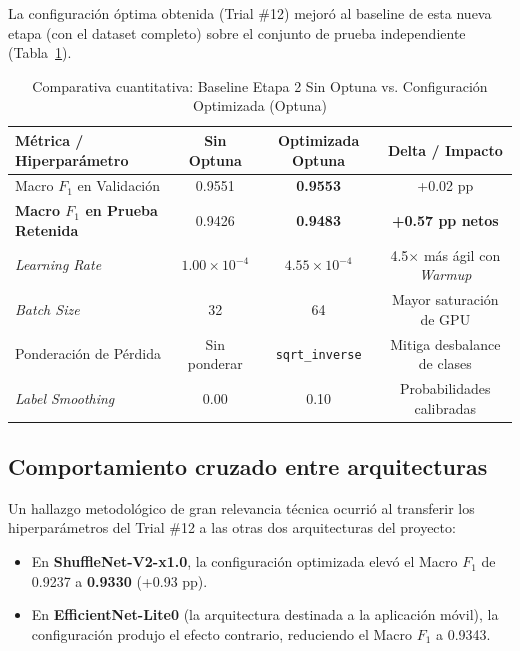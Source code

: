 \documentclass[12pt,letterpaper]{article}
\begin{document}
La configuraci\'on \'optima obtenida (Trial \#12) mejor\'o al baseline de esta nueva etapa (con el dataset completo) sobre el conjunto de prueba independiente (Tabla~\ref{tab:opt_vs_base}).

\begin{table}[H]
\caption{Comparativa cuantitativa: Baseline Etapa 2 Sin Optuna vs. Configuraci\'on Optimizada (Optuna)}
\label{tab:opt_vs_base}
\centering
\small
\begin{singlespace}
\begin{tabular}{lccc}
\toprule
\textbf{M\'etrica / Hiperpar\'ametro} & \textbf{Sin Optuna} & \textbf{Optimizada Optuna} & \textbf{Delta / Impacto} \\
\midrule
Macro $F_1$ en Validaci\'on & 0.9551 & \textbf{0.9553} & +0.02 pp \\
\textbf{Macro $F_1$ en Prueba Retenida} & 0.9426 & \textbf{0.9483} & \textbf{+0.57 pp netos} \\
\textit{Learning Rate} & $1.00 \times 10^{-4}$ & $4.55 \times 10^{-4}$ & 4.5$\times$ m\'as \'agil con \textit{Warmup} \\
\textit{Batch Size} & 32 & 64 & Mayor saturaci\'on de GPU \\
Ponderaci\'on de P\'erdida & Sin ponderar & \texttt{sqrt\_inverse} & Mitiga desbalance de clases \\
\textit{Label Smoothing} & 0.00 & 0.10 & Probabilidades calibradas \\
\bottomrule
\end{tabular}
\end{singlespace}
\end{table}

\subsection{Comportamiento cruzado entre arquitecturas}

Un hallazgo metodol\'ogico de gran relevancia t\'ecnica ocurri\'o al transferir los hiperpar\'ametros del Trial \#12 a las otras dos arquitecturas del proyecto:
\begin{itemize}
\item En \textbf{ShuffleNet-V2-x1.0}, la configuraci\'on optimizada elev\'o el Macro $F_1$ de 0.9237 a \textbf{0.9330} (+0.93 pp).
\item En \textbf{EfficientNet-Lite0} (la arquitectura destinada a la aplicaci\'on m\'ovil), la configuraci\'on produjo el efecto contrario, reduciendo el Macro $F_1$ a 0.9343.
\end{itemize}
\end{document}
